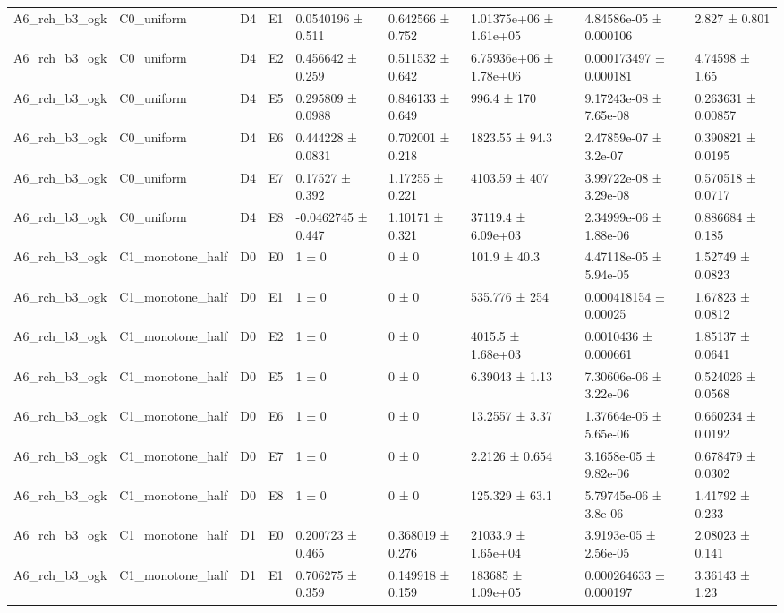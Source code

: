 \begin{table}
\begin{tabular}{lllllllll}
A6\_rch\_b3\_ogk & C0\_uniform & D4 & E1 & 0.0540196 ± 0.511 & 0.642566 ± 0.752 & 1.01375e+06 ± 1.61e+05 & 4.84586e-05 ± 0.000106 & 2.827 ± 0.801 \\
A6\_rch\_b3\_ogk & C0\_uniform & D4 & E2 & 0.456642 ± 0.259 & 0.511532 ± 0.642 & 6.75936e+06 ± 1.78e+06 & 0.000173497 ± 0.000181 & 4.74598 ± 1.65 \\
A6\_rch\_b3\_ogk & C0\_uniform & D4 & E5 & 0.295809 ± 0.0988 & 0.846133 ± 0.649 & 996.4 ± 170 & 9.17243e-08 ± 7.65e-08 & 0.263631 ± 0.00857 \\
A6\_rch\_b3\_ogk & C0\_uniform & D4 & E6 & 0.444228 ± 0.0831 & 0.702001 ± 0.218 & 1823.55 ± 94.3 & 2.47859e-07 ± 3.2e-07 & 0.390821 ± 0.0195 \\
A6\_rch\_b3\_ogk & C0\_uniform & D4 & E7 & 0.17527 ± 0.392 & 1.17255 ± 0.221 & 4103.59 ± 407 & 3.99722e-08 ± 3.29e-08 & 0.570518 ± 0.0717 \\
A6\_rch\_b3\_ogk & C0\_uniform & D4 & E8 & -0.0462745 ± 0.447 & 1.10171 ± 0.321 & 37119.4 ± 6.09e+03 & 2.34999e-06 ± 1.88e-06 & 0.886684 ± 0.185 \\
A6\_rch\_b3\_ogk & C1\_monotone\_half & D0 & E0 & 1 ± 0 & 0 ± 0 & 101.9 ± 40.3 & 4.47118e-05 ± 5.94e-05 & 1.52749 ± 0.0823 \\
A6\_rch\_b3\_ogk & C1\_monotone\_half & D0 & E1 & 1 ± 0 & 0 ± 0 & 535.776 ± 254 & 0.000418154 ± 0.00025 & 1.67823 ± 0.0812 \\
A6\_rch\_b3\_ogk & C1\_monotone\_half & D0 & E2 & 1 ± 0 & 0 ± 0 & 4015.5 ± 1.68e+03 & 0.0010436 ± 0.000661 & 1.85137 ± 0.0641 \\
A6\_rch\_b3\_ogk & C1\_monotone\_half & D0 & E5 & 1 ± 0 & 0 ± 0 & 6.39043 ± 1.13 & 7.30606e-06 ± 3.22e-06 & 0.524026 ± 0.0568 \\
A6\_rch\_b3\_ogk & C1\_monotone\_half & D0 & E6 & 1 ± 0 & 0 ± 0 & 13.2557 ± 3.37 & 1.37664e-05 ± 5.65e-06 & 0.660234 ± 0.0192 \\
A6\_rch\_b3\_ogk & C1\_monotone\_half & D0 & E7 & 1 ± 0 & 0 ± 0 & 2.2126 ± 0.654 & 3.1658e-05 ± 9.82e-06 & 0.678479 ± 0.0302 \\
A6\_rch\_b3\_ogk & C1\_monotone\_half & D0 & E8 & 1 ± 0 & 0 ± 0 & 125.329 ± 63.1 & 5.79745e-06 ± 3.8e-06 & 1.41792 ± 0.233 \\
A6\_rch\_b3\_ogk & C1\_monotone\_half & D1 & E0 & 0.200723 ± 0.465 & 0.368019 ± 0.276 & 21033.9 ± 1.65e+04 & 3.9193e-05 ± 2.56e-05 & 2.08023 ± 0.141 \\
A6\_rch\_b3\_ogk & C1\_monotone\_half & D1 & E1 & 0.706275 ± 0.359 & 0.149918 ± 0.159 & 183685 ± 1.09e+05 & 0.000264633 ± 0.000197 & 3.36143 ± 1.23 \\

\end{tabular}
\end{table}
